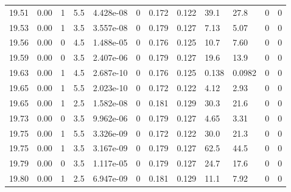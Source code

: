 \documentclass[preview]{standalone}
\begin{document}
{{{{{{{{{{{{{{{{{{\begin{tabular}{L{1.2cm}C{1.2cm} C{0.3cm}C{0.5cm} C{1.4cm}C{1.4cm} C{1.4cm}C{1.4cm} C{1.6cm}C{1.6cm} C{1.6cm}C{1.6cm}}
  19.51  &  0.00  & 1     & 5.5 &  4.428e-08  & 0  &  0.172&   0.122& 39.1 & 27.8   &  0 & 0  \\ 
  19.53  &  0.00  & 1     & 3.5 &  3.557e-08  & 0  &  0.179&   0.127& 7.13 & 5.07   &  0 & 0  \\ 
  19.56  &  0.00  & 0     & 4.5 &  1.488e-05  & 0  &  0.176&   0.125& 10.7 & 7.60   &  0 & 0  \\ 
  19.59  &  0.00  & 0     & 3.5 &  2.407e-06  & 0  &  0.179&   0.127& 19.6 & 13.9   &  0 & 0  \\ 
  19.63  &  0.00  & 1     & 4.5 &  2.687e-10  & 0  &  0.176&   0.125& 0.138 & 0.0982   &  0 & 0  \\ 
  19.65  &  0.00  & 1     & 5.5 &  2.023e-10  & 0  &  0.172&   0.122& 4.12 & 2.93   &  0 & 0  \\ 
  19.65  &  0.00  & 1     & 2.5 &  1.582e-08  & 0  &  0.181&   0.129& 30.3 & 21.6   &  0 & 0  \\ 
  19.73  &  0.00  & 0     & 3.5 &  9.962e-06  & 0  &  0.179&   0.127& 4.65 & 3.31   &  0 & 0  \\ 
  19.75  &  0.00  & 1     & 5.5 &  3.326e-09  & 0  &  0.172&   0.122& 30.0 & 21.3   &  0 & 0  \\ 
  19.75  &  0.00  & 1     & 3.5 &  3.167e-09  & 0  &  0.179&   0.127& 62.5 & 44.5   &  0 & 0  \\ 
  19.79  &  0.00  & 0     & 3.5 &  1.117e-05  & 0  &  0.179&   0.127& 24.7 & 17.6   &  0 & 0  \\ 
  19.80  &  0.00  & 1     & 2.5 &  6.947e-09  & 0  &  0.181&   0.129& 11.1 & 7.92   &  0 & 0  \\ 
\hline 
\end{tabular} 

}}}}}}}}}}}}}}}}}}
\end{document}
